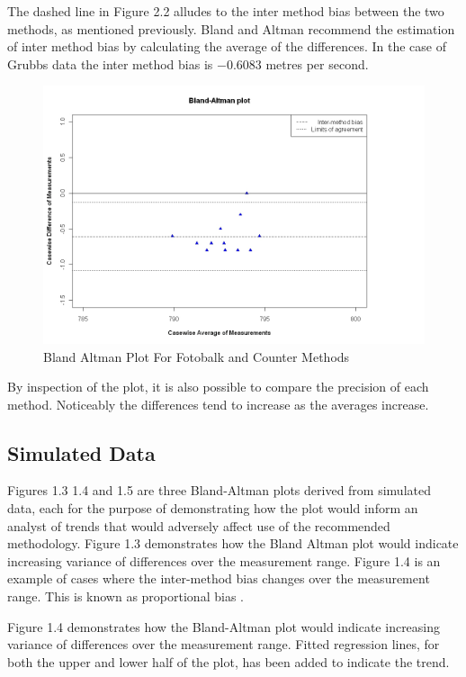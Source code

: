 \documentclass[Main.tex]{subfiles}
\begin{document}
The dashed line in Figure 2.2 alludes to the inter method bias
	between the two methods, as mentioned previously. Bland and Altman
	recommend the estimation of inter method bias by calculating the
	average of the differences. In the case of Grubbs data the inter
	method bias is $-0.6083$ metres per second.

	\begin{figure}[h!]
		\begin{center}
			\includegraphics[width=120mm]{images/GrubbsBAplot.jpeg}
			\caption{Bland Altman Plot For Fotobalk and Counter Methods}\label{GrubbsBA}
		\end{center}
	\end{figure}

	By inspection of the plot, it is also possible to compare the precision of each method. Noticeably the differences tend to
	increase as the averages increase.
	
 	\subsection{Simulated Data}

Figures 1.3 1.4 and 1.5 are three Bland-Altman plots derived from
	simulated data, each for the purpose of demonstrating how the plot
	would inform an analyst of trends that would adversely affect use
	of the recommended methodology. Figure 1.3 demonstrates how the
	Bland Altman plot would indicate increasing variance of
	differences over the measurement range. Figure 1.4 is an example
	of cases where the inter-method bias changes over the measurement
	range. This is known as proportional bias \citep{ludbrook97}.


	
	Figure 1.4 demonstrates how the Bland-Altman plot would indicate
	increasing variance of differences over the measurement range.
	Fitted regression lines, for both the upper and lower half of the
	plot, has been added to indicate the trend. 
	
\end{document}
